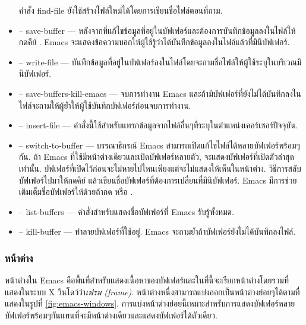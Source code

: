 \begin{thwbr}
\begin{itemize}
คำสั่ง find-file ยังใช้สร้างไฟล์ใหม่ได้โดยการเขียนชื่อไฟล์ตอนที่ถาม.

\begin{figure}[!hbt]
\end{figure}

\begin{figure}[!hbt]
\end{figure}

\item {} -- save-buffer --- หลังจากที่แก้ไขข้อมูลที่อยู่ในบัฟเฟอร์และต้องการบันทึกข้อมูลลงในไฟล์ให้กดคีย์ . Emacs จะแสดงข้อความบอกให้ผู้ใช้รู้ว่าได้บันทึกข้อมูลลงในไฟล์แล้วที่มินิบัฟเฟอร์.
\item {} -- write-file --- บันทึกข้อมูลที่อยู่ในบัฟเฟอร์ลงในไฟล์โดยจะถามชื่อไฟล์ให้ผู้ใช้ระบุในบริเวณมินิบัฟเฟอร์. 
\item {} -- save-buffers-kill-emacs --- จบการทำงาน Emacs และถ้ามีบัฟเฟอร์ที่ยังไม่ได้บันทึกลงในไฟล์จะถามให้ผู้ย้ำให้ผู้ใช้บันทึกบัฟเฟอร์ก่อนจบการทำงาน.
\item {} -- insert-file --- คำสั่งนี้ใช้สำหรับแทรกข้อมูลจากไฟล์อื่นๆที่ระบุในตำแหน่งเคอร์เซอร์ปัจจุบัน.
\item {} -- switch-to-buffer --- บรรณาธิกรณ์ Emacs สามารถเปิดแก้ไขไฟล์ได้หลายบัฟเฟอร์พร้อมๆกัน. ถ้า Emacs ที่ใช้มีหน้าต่างเดียวและเปิดบัฟเฟอร์หลายตัว, จะแสดงบัฟเฟอร์ที่เปิดตัวล่าสุดเท่านั้น. บัฟเฟอร์ที่เปิดไว้ก่อนจะไม่หายไปไหนเพียงแต่จะไม่แสดงให้เห็นในหน้าต่าง. วิธีการสลับบัฟเฟอร์ไปมาให้กดคีย์  แล้วเขียนชื่อบัฟเฟอร์ที่ต้องการเปลี่ยนที่มินิบัฟเฟอร์. Emacs มีการช่วยเติมเต็มชื่อบัฟเฟอร์ให้ด้วยถ้ากด  หรือ . 
\item {} -- list-buffers --- คำสั่งสำหรับแสดงชื่อบัฟเฟอร์ที่ Emacs รับรู้ทั้งหมด.
\item {} -- kill-buffer --- ทำลายบัฟเฟอร์ที่ใช้อยู่. Emacs จะถามย้ำถ้าบัฟเฟอร์ยังไม่ได้บันทึกลงไฟล์.
\end{itemize}

\subsubsection{หน้าต่าง}
หน้าต่างใน Emacs คือพื้นที่สำหรับแสดงเนื้อหาของบัฟเฟอร์และในที่นี้จะเรียกหน้าต่างโดยรวมที่แสดงในระบบ X วินโดว์ว่า\emph{เฟรม (frame)}. หน้าต่างหนึ่งสามารถแบ่งออกเป็นหน้าต่างย่อยๆได้ตามที่แสดงในรูปที่ \ref{fig:emacs-windows}. การแบ่งหน้าต่างย่อยนี้เหมาะสำหรับการแสดงบัฟเฟอร์หลายบัฟเฟอร์พร้อมๆกันแทนที่จะมีหน้าต่างเดียวและแสดงบัฟเฟอร์ได้ตัวเดียว. 


\end{thwbr}
